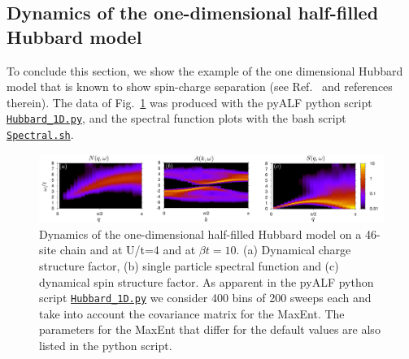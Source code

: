  \subsection{Dynamics of the one-dimensional half-filled Hubbard model}

To conclude this section, we show the example of the one dimensional Hubbard model that is known to show spin-charge separation (see Ref.~\cite{Abendschein06}  and references therein).    The data of Fig.~\ref{Fig:Spectral1D}    was produced with the pyALF python script  \href{https://git.physik.uni-wuerzburg.de/ALF/ALF/-/blob/master/Documentation/Figures/MaxEnt/Hubbard_1D.py}{\texttt{Hubbard\_1D.py}}, and   the spectral function plots with the bash script \href{https://git.physik.uni-wuerzburg.de/ALF/ALF/-/blob/master/Documentation/Figures/MaxEnt/Spectral.sh}{\texttt{Spectral.sh}}. 

\begin{figure}
\center
\includegraphics[width=\textwidth]{Figures/MaxEnt/Spectral_1D.pdf}

\caption{Dynamics of the one-dimensional half-filled Hubbard model  on a 46-site chain   and at U/t=4 and at $\beta t = 10$.  (a) Dynamical charge structure factor, (b) single particle spectral function and (c) dynamical spin structure factor.   As apparent in the pyALF python script 
 \href{https://git.physik.uni-wuerzburg.de/ALF/ALF/-/blob/master/Documentation/Figures/MaxEnt/Hubbard_1D.py}{\texttt{Hubbard\_1D.py}}  we consider 400  bins of 200 sweeps  each and  take into account the covariance matrix for the MaxEnt.  The parameters for the MaxEnt  that differ for the default values are also listed in the  python script.}
        \label{Fig:Spectral1D}
\end{figure}

